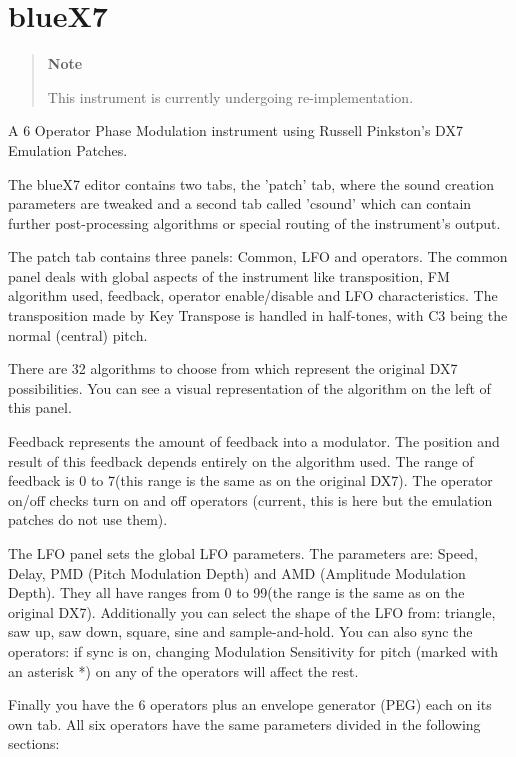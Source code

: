 \section{blueX7}\label{blueX7}

\begin{quote}
\textbf{Note}

This instrument is currently undergoing re-implementation.
\end{quote}

A 6 Operator Phase Modulation instrument using Russell Pinkston's DX7
Emulation Patches.

The blueX7 editor contains two tabs, the 'patch' tab, where the sound
creation parameters are tweaked and a second tab called 'csound' which
can contain further post-processing algorithms or special routing of the
instrument's output.

The patch tab contains three panels: Common, LFO and operators. The
common panel deals with global aspects of the instrument like
transposition, FM algorithm used, feedback, operator enable/disable and
LFO characteristics. The transposition made by Key Transpose is handled
in half-tones, with C3 being the normal (central) pitch.

There are 32 algorithms to choose from which represent the original DX7
possibilities. You can see a visual representation of the algorithm on
the left of this panel.

Feedback represents the amount of feedback into a modulator. The
position and result of this feedback depends entirely on the algorithm
used. The range of feedback is 0 to 7(this range is the same as on the
original DX7). The operator on/off checks turn on and off operators
(current, this is here but the emulation patches do not use them).

The LFO panel sets the global LFO parameters. The parameters are: Speed,
Delay, PMD (Pitch Modulation Depth) and AMD (Amplitude Modulation
Depth). They all have ranges from 0 to 99(the range is the same as on
the original DX7). Additionally you can select the shape of the LFO
from: triangle, saw up, saw down, square, sine and sample-and-hold. You
can also sync the operators: if sync is on, changing Modulation
Sensitivity for pitch (marked with an asterisk *) on any of the
operators will affect the rest.

Finally you have the 6 operators plus an envelope generator (PEG) each
on its own tab. All six operators have the same parameters divided in
the following sections:

